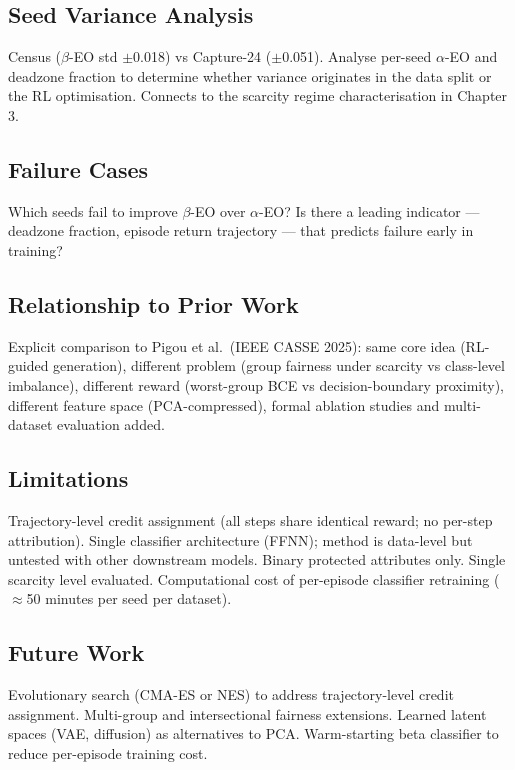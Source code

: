 \documentclass[12pt]{article}
\begin{document}
\subsection{Seed Variance Analysis}
Census ($\beta$-EO std $\pm$0.018) vs Capture-24 ($\pm$0.051). Analyse
per-seed $\alpha$-EO and deadzone fraction to determine whether variance
originates in the data split or the RL optimisation. Connects to the scarcity
regime characterisation in Chapter 3.

\subsection{Failure Cases}
Which seeds fail to improve $\beta$-EO over $\alpha$-EO? Is there a
leading indicator --- deadzone fraction, episode return trajectory --- that
predicts failure early in training?

\subsection{Relationship to Prior Work}
Explicit comparison to Pigou et al.\ (IEEE CASSE 2025): same core idea
(RL-guided generation), different problem (group fairness under scarcity vs
class-level imbalance), different reward (worst-group BCE vs decision-boundary
proximity), different feature space (PCA-compressed), formal ablation studies
and multi-dataset evaluation added.

\subsection{Limitations}
Trajectory-level credit assignment (all steps share identical reward; no
per-step attribution). Single classifier architecture (FFNN); method is
data-level but untested with other downstream models. Binary protected
attributes only. Single scarcity level evaluated. Computational cost of
per-episode classifier retraining ($\approx$50 minutes per seed per dataset).

\subsection{Future Work}
Evolutionary search (CMA-ES or NES) to address trajectory-level credit
assignment. Multi-group and intersectional fairness extensions. Learned latent
spaces (VAE, diffusion) as alternatives to PCA. Warm-starting beta classifier
to reduce per-episode training cost.

\end{document}
